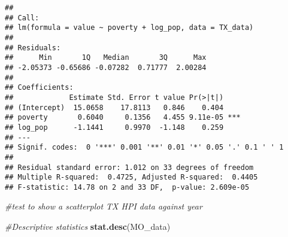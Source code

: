 \documentclass[
]{article}
\newenvironment{Shaded}{\begin{snugshade}}{\end{snugshade}}
\newcommand{\CommentTok}[1]{\textcolor[rgb]{0.56,0.35,0.01}{\textit{#1}}}
\newcommand{\KeywordTok}[1]{\textcolor[rgb]{0.13,0.29,0.53}{\textbf{#1}}}
\newcommand{\NormalTok}[1]{#1}
\newcommand{\OperatorTok}[1]{\textcolor[rgb]{0.81,0.36,0.00}{\textbf{#1}}}
\newcommand{\StringTok}[1]{\textcolor[rgb]{0.31,0.60,0.02}{#1}}
\begin{document}
\begin{verbatim}
## 
## Call:
## lm(formula = value ~ poverty + log_pop, data = TX_data)
## 
## Residuals:
##      Min       1Q   Median       3Q      Max 
## -2.05373 -0.65686 -0.07282  0.71777  2.00284 
## 
## Coefficients:
##             Estimate Std. Error t value Pr(>|t|)    
## (Intercept)  15.0658    17.8113   0.846    0.404    
## poverty       0.6040     0.1356   4.455 9.11e-05 ***
## log_pop      -1.1441     0.9970  -1.148    0.259    
## ---
## Signif. codes:  0 '***' 0.001 '**' 0.01 '*' 0.05 '.' 0.1 ' ' 1
## 
## Residual standard error: 1.012 on 33 degrees of freedom
## Multiple R-squared:  0.4725, Adjusted R-squared:  0.4405 
## F-statistic: 14.78 on 2 and 33 DF,  p-value: 2.609e-05
\end{verbatim}

\begin{Shaded}
\begin{Highlighting}[]
\CommentTok{#test to show a scatterplot TX HPI data against year}
\end{Highlighting}
\end{Shaded}

\begin{Shaded}
\end{Shaded}

\begin{Shaded}
\begin{Highlighting}[]
\CommentTok{#Descriptive statistics}
\KeywordTok{stat.desc}\NormalTok{(MO_data)}
\end{Highlighting}
\end{Shaded}
\end{document}
